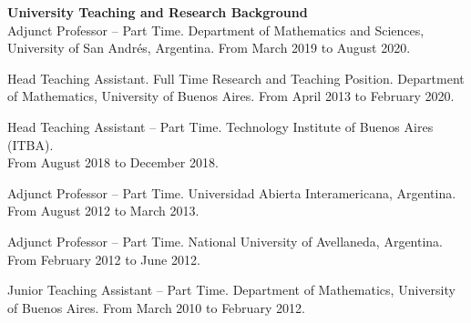 \textbf{University Teaching and Research Background}\\[6pt]
Adjunct Professor -- Part Time. Department of Mathematics and Sciences,
University of San Andr\'es, Argentina. From March 2019 to August 2020.

Head Teaching Assistant. Full Time Research and Teaching Position. 
Department of Mathematics, University of Buenos Aires. From April 2013 to
February 2020.

Head Teaching Assistant -- Part Time. Technology Institute of Buenos Aires (ITBA).\\
From August 2018 to December 2018.

Adjunct Professor -- Part Time. Universidad Abierta Interamericana, Argentina.\\
From August 2012 to March 2013.

Adjunct Professor -- Part Time. National University of Avellaneda, Argentina.
From February 2012 to June 2012.

Junior Teaching Assistant -- Part Time. Department of Mathematics, University of Buenos Aires. From March 2010 to February 2012.
